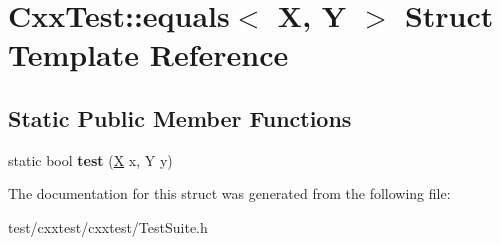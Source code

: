 \hypertarget{structCxxTest_1_1equals}{\section{Cxx\-Test\-:\-:equals$<$ X, Y $>$ Struct Template Reference}
\label{structCxxTest_1_1equals}
}
\subsection*{Static Public Member Functions}
\begin{DoxyCompactItemize}
\item 
\hypertarget{structCxxTest_1_1equals_a03a782c1be1468c9ea2bc16ae8a39e27}{static bool {\bfseries test} (\hyperlink{classX}{X} x, Y y)}\label{structCxxTest_1_1equals_a03a782c1be1468c9ea2bc16ae8a39e27}

\end{DoxyCompactItemize}


The documentation for this struct was generated from the following file\-:\begin{DoxyCompactItemize}
\item 
test/cxxtest/cxxtest/Test\-Suite.\-h\end{DoxyCompactItemize}
